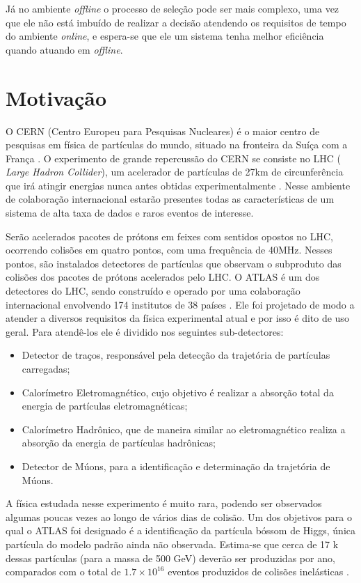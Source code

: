 Já no ambiente {\it offline} o processo de seleção pode ser mais
complexo, uma vez que ele não está imbuído de realizar a decisão atendendo os
requisitos de tempo do ambiente {\it online}, e espera-se que ele um sistema
tenha melhor eficiência quando atuando em {\it offline}.

\section{Motivação} 

O CERN (Centro Europeu para Pesquisas Nucleares) é o maior centro de
pesquisas em física de partículas do mundo, situado na fronteira da Suíça com a
França \cite{webCERN}. O experimento de grande repercussão do CERN se consiste no LHC ({\it
Large Hadron Collider}), um acelerador de partículas de 27km de
circunferência que irá atingir energias nunca antes obtidas
experimentalmente \cite{webLHC}. 
Nesse ambiente de colaboração internacional estarão presentes
todas as características de um sistema de alta taxa de dados e raros eventos de
interesse.

Serão acelerados pacotes de prótons em feixes com sentidos opostos no LHC,
ocorrendo colisões em quatro pontos, com uma frequência de 40MHz. Nesses pontos, são instalados 
detectores de partículas que observam o subproduto das colisões dos pacotes de prótons 
acelerados pelo LHC. O ATLAS é um dos detectores do LHC, sendo construído e operado por 
uma colaboração internacional envolvendo 174 institutos de 38
países \cite{webATLAS}. Ele foi projetado 
de modo a atender a diversos requisitos da física experimental atual e por isso é dito de uso
geral. Para atendê-los ele é dividido nos seguintes sub-detectores:

\begin{itemize}
\item Detector de traços, responsável pela detecção da trajetória de partículas carregadas;
\item Calorímetro Eletromagnético, cujo objetivo é realizar a absorção total da
energia de partículas eletromagnéticas;
\item Calorímetro Hadrônico, que de maneira similar ao eletromagnético realiza a
absorção da energia de partículas hadrônicas;
\item Detector de Múons, para a identificação e determinação da trajetória de
Múons.
\end{itemize}

A física estudada nesse experimento é muito rara, podendo ser observados algumas
poucas vezes ao longo de vários dias de colisão. Um dos objetivos para o qual o
ATLAS foi designado é a identificação da partícula bóssom de Higgs, única partícula 
do modelo padrão ainda não observada. Estima-se que cerca de 17 k dessas
partículas (para a massa de 500 GeV) deverão ser produzidas por ano, comparados
com o total de $1.7\times10^{16}$ eventos produzidos de colisões inelásticas \cite{resumo_ATLAS}. 

